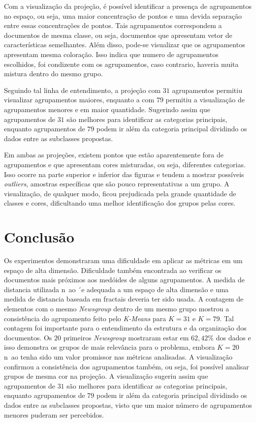 \documentclass[conference]{IEEEtran}
\begin{document}
Com a visualização da projeção, é possível identificar a presença de agrupamentos no espaço, ou seja, uma maior concentração de pontos e uma devida separação entre essas concentrações de pontos. Tais agrupamentos correspondem a documentos de mesma classe, ou seja, documentos que apresentam vetor de características semelhantes. Além disso, pode-se visualizar que os agrupamentos apresentam mesma coloração. Isso indica que numero de agrupamentos escolhidos, foi condizente com os agrupamentos, caso contrario, haveria muita mistura dentro do mesmo grupo.

Seguindo tal linha de entendimento, a projeção com $31$ agrupamentos permitiu visualizar agrupamentos maiores, enquanto a com $79$ permitiu a visualização de agrupamentos menores e em maior quantidade. Sugerindo assim que agrupamentos de $31$ são melhores para identificar as categorias principais, enquanto agrupamentos de $79$ podem ir além da categoria principal dividindo os dados entre as subclasses propostas.

Em ambas as projeções, existem pontos que estão aparentemente fora de agrupamentos e que apresentam cores misturadas, ou seja, diferentes categorias. Isso ocorre na parte superior e inferior das figuras e tendem a mostrar possíveis \emph{outliers}, amostras específicas que são pouco representativas a um grupo. A visualização, de qualquer modo, ficou prejudicada pela grande quantidade de classes e cores, dificultando uma melhor identificação dos grupos pelas cores.

\section{Conclusão}

Os experimentos demonstraram uma dificuldade em aplicar as métricas em um espaço de alta dimensão. Dificuldade também encontrada ao verificar os documentos mais próximos aos medóides de alguns agrupamentos. A medida de distancia utilizada n~ao ´e adequada a um espaço de alta dimensão e uma medida de distancia baseada em fractais deveria ter sido usada\cite{b1}. A contagem de elementos com o mesmo \emph{Newsgroup} dentro de um mesmo grupo mostrou a consistência do agrupamento feito pelo \emph{K-Means} para $K=31$ e $K=79$. Tal contagem foi importante para o entendimento da estrutura e da organização dos documentos. Os $20$ primeiros \emph{Newsgroup} mostraram estar em $62,42\%$ dos dados e isso demonstra os grupos de mais relevância para o problema, embora $K=20$ n~ao tenha sido um valor promissor nas métricas analisadas. A visualização confirmou a consistência dos agrupamentos também, ou seja, foi possível analisar grupos de mesma cor na projeção. A visualização sugeriu assim que agrupamentos de $31$ são melhores para identificar as categorias principais, enquanto agrupamentos de $79$ podem ir além da categoria principal dividindo os dados entre as subclasses propostas, visto que um maior número de agrupamentos menores puderam ser percebidos.
\end{document}
